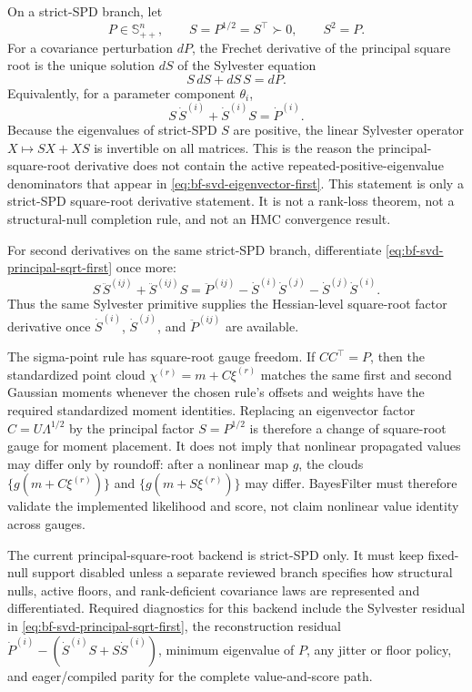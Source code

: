On a strict-SPD branch, let
\[
  P\in\mathbb S_{++}^n,\qquad
  S=P^{1/2}=S^\top\succ0,\qquad
  S^2=P .
\]
For a covariance perturbation $dP$, the Frechet derivative of the principal
square root is the unique solution $dS$ of the Sylvester equation
\begin{equation}
\label{eq:bf-svd-principal-sqrt-sylvester-first}
  S\,dS+dS\,S=dP .
\end{equation}
Equivalently, for a parameter component $\theta_i$,
\begin{equation}
\label{eq:bf-svd-principal-sqrt-first}
  S\,\dot S^{(i)}+\dot S^{(i)}S=\dot P^{(i)} .
\end{equation}
Because the eigenvalues of strict-SPD $S$ are positive, the linear
Sylvester operator $X\mapsto SX+XS$ is invertible on all matrices.  This is the
reason the principal-square-root derivative does not contain the active
repeated-positive-eigenvalue denominators that appear in
\eqref{eq:bf-svd-eigenvector-first}.  This statement is only a strict-SPD
square-root derivative statement.  It is not a rank-loss theorem, not a
structural-null completion rule, and not an HMC convergence result.

For second derivatives on the same strict-SPD branch, differentiate
\eqref{eq:bf-svd-principal-sqrt-first} once more:
\begin{equation}
\label{eq:bf-svd-principal-sqrt-second}
  S\,\ddot S^{(ij)}+\ddot S^{(ij)}S
  =
  \ddot P^{(ij)}
  -\dot S^{(i)}\dot S^{(j)}
  -\dot S^{(j)}\dot S^{(i)} .
\end{equation}
Thus the same Sylvester primitive supplies the Hessian-level square-root
factor derivative once $\dot S^{(i)}$, $\dot S^{(j)}$, and
$\ddot P^{(ij)}$ are available.

The sigma-point rule has square-root gauge freedom.  If $C C^\top=P$, then
the standardized point cloud $\chi^{(r)}=m+C\xi^{(r)}$ matches the same first
and second Gaussian moments whenever the chosen rule's offsets and weights
have the required standardized moment identities.  Replacing an eigenvector
factor $C=U\Lambda^{1/2}$ by the principal factor $S=P^{1/2}$ is therefore a
change of square-root gauge for moment placement.  It does not imply that
nonlinear propagated values may differ only by roundoff: after a nonlinear map
$g$, the clouds $\{g(m+C\xi^{(r)})\}$ and $\{g(m+S\xi^{(r)})\}$ may differ.
BayesFilter must therefore validate the implemented likelihood and score, not
claim nonlinear value identity across gauges.

The current principal-square-root backend is strict-SPD only.  It must keep
fixed-null support disabled unless a separate reviewed branch specifies how
structural nulls, active floors, and rank-deficient covariance laws are
represented and differentiated.  Required diagnostics for this backend include
the Sylvester residual in
\eqref{eq:bf-svd-principal-sqrt-first}, the reconstruction residual
$\dot P^{(i)}-(\dot S^{(i)}S+S\dot S^{(i)})$, minimum eigenvalue of $P$, any
jitter or floor policy, and eager/compiled parity for the complete
value-and-score path.

